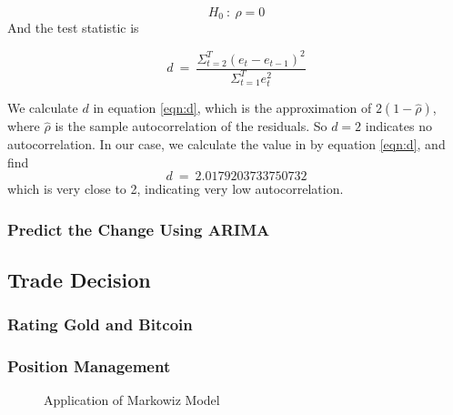 \documentclass[12pt,a4paper]{article}
\newcommand{\Predictor}{ARIMA }
\begin{document}
\begin{spacing}{1.2}
\begin{enumerate}
$$
	H_0 \ : \ \rho = 0	
$$
	And the test statistic is
	
	\begin{equation}\label{eqn:d}
		d \ = \ \frac{\Sigma_{t=2}^T(e_t-e_{t-1})^2}{\Sigma_{t=1}^T e_t^2}
	\end{equation}

	We calculate $d$ in equation \ref{eqn:d}, which is the approximation of $2(1-\hat{\rho})$, where $\hat{\rho}$ is the sample autocorrelation of the residuals. So $d=2$ indicates no autocorrelation. In our case, we calculate the value in by equation \ref{eqn:d}, and find
	$$
	d \ = \ 2.0179203733750732
	$$
	which is very close to 2, indicating very low autocorrelation. 
\end{enumerate}


\subsubsection{Predict the Change Using \Predictor}


\subsection{Trade Decision}

\subsubsection{Rating Gold and Bitcoin}

\subsubsection{Position Management}

\begin{figure}[H]
	\caption{Application of Markowiz Model}
	\label{figure:markowiz}
\end{figure}




\end{spacing}
\end{document}
